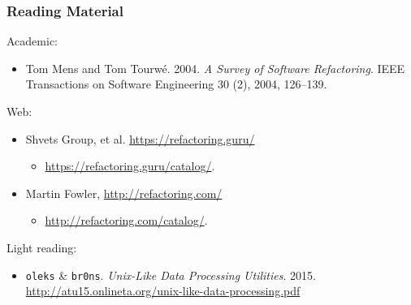 \begin{frame}

\frametitle{Reading Material}

\footnotesize

Academic:

\begin{itemize}

\item Tom Mens and Tom Tourw\'e. 2004. \emph{A Survey of Software Refactoring}.
IEEE Transactions on Software Engineering 30 (2), 2004, 126--139.

\end{itemize}

Web:

\begin{itemize}

\item Shvets Group, et al. \url{https://refactoring.guru/}

\begin{itemize}

\item \footnotesize \url{https://refactoring.guru/catalog/}.

\end{itemize}

\item Martin Fowler, \url{http://refactoring.com/}

\begin{itemize}

\item \footnotesize \url{http://refactoring.com/catalog/}.

\end{itemize}

\end{itemize}

Light reading:

\begin{itemize}

\item \texttt{oleks} \& \texttt{br0ns}. \emph{Unix-Like Data Processing
Utilities}. 2015. \url{http://atu15.onlineta.org/unix-like-data-processing.pdf}

\end{itemize}

\end{frame}


